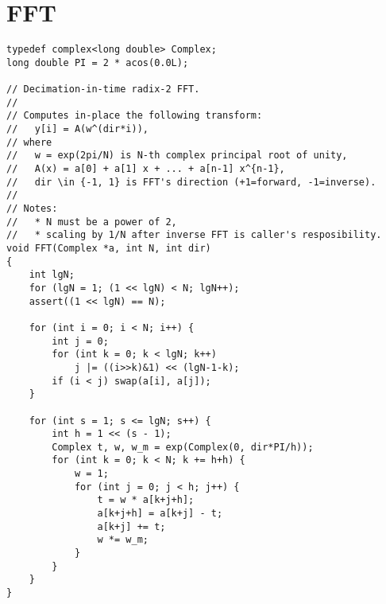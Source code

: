 \documentclass[a4paper, 12pt]{article}
\newcommand{\Section}[1]{
  \section*{#1}
  \addcontentsline{toc}{subsection}{#1}
  \vspace{-3mm}
}
\newcommand{\Topic}[1]{\textbf{#1}}
\begin{document}


\newpage

\Section{FFT}
\begin{Verbatim}[fontsize=\small]
typedef complex<long double> Complex;
long double PI = 2 * acos(0.0L);

// Decimation-in-time radix-2 FFT.
//
// Computes in-place the following transform:
//   y[i] = A(w^(dir*i)),
// where
//   w = exp(2pi/N) is N-th complex principal root of unity,
//   A(x) = a[0] + a[1] x + ... + a[n-1] x^{n-1},
//   dir \in {-1, 1} is FFT's direction (+1=forward, -1=inverse).
//
// Notes:
//   * N must be a power of 2,
//   * scaling by 1/N after inverse FFT is caller's resposibility.
void FFT(Complex *a, int N, int dir)
{
    int lgN;
    for (lgN = 1; (1 << lgN) < N; lgN++);
    assert((1 << lgN) == N);

    for (int i = 0; i < N; i++) {
        int j = 0;
        for (int k = 0; k < lgN; k++)
            j |= ((i>>k)&1) << (lgN-1-k);
        if (i < j) swap(a[i], a[j]);
    }

    for (int s = 1; s <= lgN; s++) {
        int h = 1 << (s - 1);
        Complex t, w, w_m = exp(Complex(0, dir*PI/h));
        for (int k = 0; k < N; k += h+h) {
            w = 1;
            for (int j = 0; j < h; j++) {
                t = w * a[k+j+h];
                a[k+j+h] = a[k+j] - t;
                a[k+j] += t;
                w *= w_m;
            }
        }
    }
}
\end{Verbatim}
\end{document}
